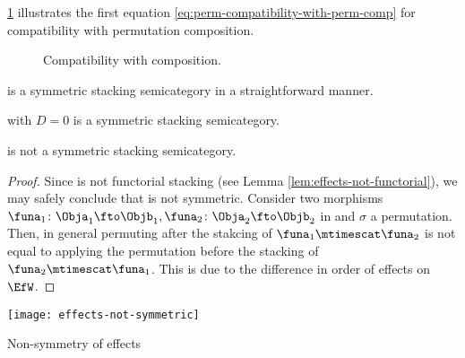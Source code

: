 \cref{fig:compatibility-perm-comp} illustrates the first equation \cref{eq:perm-compatibility-with-perm-comp} for compatibility with permutation composition.

\begin{figure}[h]
    \centering
     \qquad \qquad
    \caption{Compatibility with composition. }
    \label{fig:compatibility-perm-comp}
\end{figure}




\begin{example}
    \SetL is a symmetric stacking semicategory in a straightforward manner.
\end{example}


\begin{example}
    \LTI with $D=0$ is a symmetric stacking semicategory.
\end{example}

\begin{lemma}
    \label{lem:effects-not-symmetric}
    \Effects is not a symmetric stacking semicategory.
\end{lemma}
\begin{proof}
Since \Effects is not functorial stacking (see Lemma \cref{lem:effects-not-functorial}), we may safely conclude that \Effects is not symmetric. Consider two morphisms $\funa_1\colon\Obja_1\fto\Objb_1, \funa_2\colon\Obja_2\fto\Objb_2$ in \Effects and $\sigma$ a permutation. Then, in general permuting after the stakcing of $\funa_1 \mtimescat \funa_2$ is not equal to applying the permutation before the stacking of $\funa_2 \mtimescat \funa_1$. This is due to the difference in order of effects on $\EfW$.
\end{proof}
\begin{marginfigure}
    \centering
    \texttt{[image: effects-not-symmetric]}
    \caption{Non-symmetry of effects}
    \label{fig:effects-not-symmetric}
\end{marginfigure}

